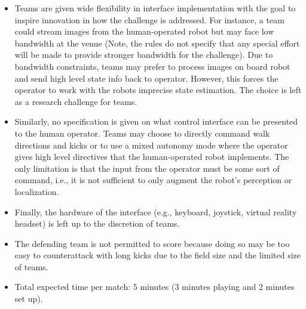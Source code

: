 \begin{itemize}
\item Teams are given wide flexibility in interface implementation with the goal to inspire innovation in how the challenge is addressed. For instance, a team could stream images from the human-operated robot but may face low bandwidth at the venue  (Note, the rules do not specify that any special effort will be made to provide stronger bandwidth for the challenge). Due to bandwidth constraints, teams may prefer to process images on board robot and send high level state info back to operator. However, this forces the operator to work with the robots imprecise state estimation. The choice is left as a research challenge for teams.
\item Similarly, no specification is given on what control interface can be presented to the human operator. Teams may choose to directly command walk directions and kicks or to use a mixed autonomy mode where the operator gives high level directives that the human-operated robot implements. The only limitation is that the input from the operator must be some sort of command, i.e., it is not sufficient to only augment the robot's perception or localization.
\item Finally, the hardware of the interface (e.g., keyboard, joystick, virtual reality headset) is left up to the discretion of teams.
\item The defending team is not permitted to score because doing so may be too easy to counterattack with long kicks due to the field size and the limited size of teams.
\item Total expected time per match: 5 minutes (3 minutes playing and 2 minutes set up). 
\end{itemize}

